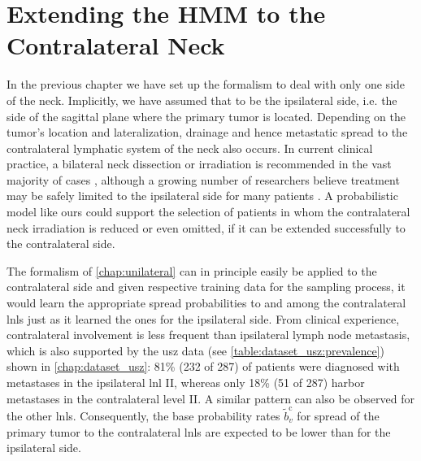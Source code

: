 \documentclass[\relativeRoot/main.tex]{subfiles}
\begin{document}
\chapter{Extending the HMM to the Contralateral Neck}
\label{chap:bilateral}

In the previous chapter we have set up the formalism to deal with only one side of the neck. Implicitly, we have assumed that to be the ipsilateral side, i.e. the side of the sagittal plane where the primary tumor is located. Depending on the tumor's location and lateralization, drainage and hence metastatic spread to the contralateral lymphatic system of the neck also occurs. In current clinical practice, a bilateral neck dissection or irradiation is recommended in the vast majority of cases \cite{de_veij_mestdagh_incidence_2019}, although a growing number of researchers believe treatment may be safely limited to the ipsilateral side for many patients \cite{rackley_unilateral_2017,de_veij_mestdagh_spectct-guided_2020}. A probabilistic model like ours could support the selection of patients in whom the contralateral neck irradiation is reduced or even omitted, if it can be extended successfully to the contralateral side.

The formalism of \cref{chap:unilateral} can in principle easily be applied to the contralateral side and given respective training data for the sampling process, it would learn the appropriate spread probabilities to and among the contralateral \glspl{lnl} just as it learned the ones for the ipsilateral side. From clinical experience, contralateral involvement is less frequent than ipsilateral lymph node metastasis, which is also supported by the \gls{usz} data (see \cref{table:dataset_usz:prevalence}) shown in \cref{chap:dataset_usz}: 81\% (232 of 287) of patients were diagnosed with metastases in the ipsilateral \gls{lnl} II, whereas only 18\% (51 of 287) harbor metastases in the contralateral level II. A similar pattern can also be observed for the other \glspl{lnl}. Consequently, the base probability rates $\tilde{b}^\text{c}_v$ for spread of the primary tumor to the contralateral \glspl{lnl} are expected to be lower than for the ipsilateral side.
\end{document}
